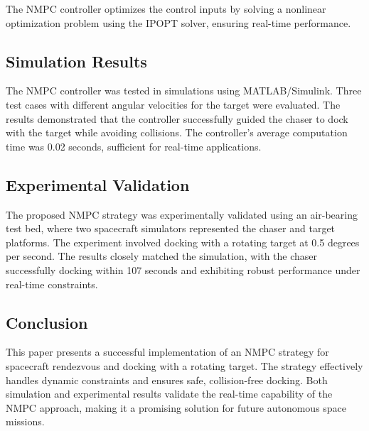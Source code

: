 \documentclass[a4paper,12pt]{article}
\begin{document}
        The NMPC controller optimizes the control inputs by solving a nonlinear optimization problem using the IPOPT solver, ensuring real-time performance.
        
        \subsection{Simulation Results}
        The NMPC controller was tested in simulations using MATLAB/Simulink. Three test cases with different angular velocities for the target were evaluated. The results demonstrated that the controller successfully guided the chaser to dock with the target while avoiding collisions. The controller's average computation time was 0.02 seconds, sufficient for real-time applications.
        
        \subsection{Experimental Validation}
        The proposed NMPC strategy was experimentally validated using an air-bearing test bed, where two spacecraft simulators represented the chaser and target platforms. The experiment involved docking with a rotating target at 0.5 degrees per second. The results closely matched the simulation, with the chaser successfully docking within 107 seconds and exhibiting robust performance under real-time constraints.
        
        \subsection{Conclusion}
        This paper presents a successful implementation of an NMPC strategy for spacecraft rendezvous and docking with a rotating target. The strategy effectively handles dynamic constraints and ensures safe, collision-free docking. Both simulation and experimental results validate the real-time capability of the NMPC approach, making it a promising solution for future autonomous space missions.
\end{document}
